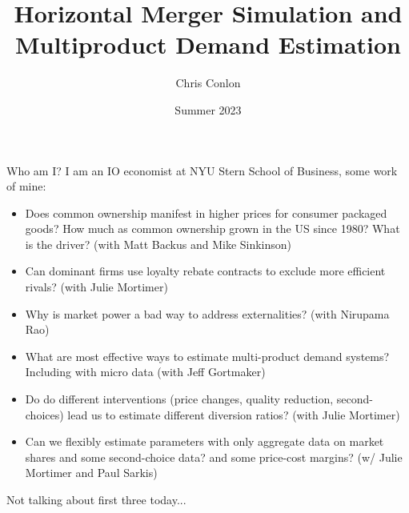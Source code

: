

\usepackage{lipsum}
\usepackage{amsmath} 
\usepackage{amsthm} 
\usepackage{amssymb} 
\usepackage{mathtools}
\usepackage{dutchcal}


\newcommand{\vect}[1]{\boldsymbol{\mathbf{#1}}}
\newcommand{\pd}[2]{\frac{\partial{#1}}{\partial{#2}}}
\newcommand{\expect}[2]{\mathbb{E}_{#1}\left[{#2}\right]}
\newcommand{\expectsmall}[2]{\mathbb{E}_{#1}{#2}}
\newcommand{\expectsuper}[3]{\mathbb{E}_{#1}^{#2}\left[{#3}\right]}
\newcommand{\ind}[1]{\mathbbm{1}\left\{{#1}\right\}}
\newcommand{\prob}[1]{\mathbb{P}\left\{{#1}\right\}}
\newcommand{\derivative}[2]{\frac{d{#2}}{d{#1}}}
\newcommand{\cat}[1]{\citeasnoun{#1}}


\newcommand*{\vertbar}{\rule[-1ex]{0.5pt}{2.5ex}}
\newcommand*{\horzbar}{\rule[.5ex]{2.5ex}{0.5pt}}


\title{Horizontal Merger Simulation and Multiproduct Demand Estimation}
\author{Chris Conlon}

\date{Summer 2023}








\begin{frame}[plain] %
\titlepage
\end{frame}


\begin{frame}{Who am I?}
I am an IO economist at NYU Stern School of Business, some work of mine:
\begin{itemize}
    \item Does \alert{common ownership} manifest in higher prices for consumer packaged goods? How much as common ownership grown in the US since 1980? What is the driver? (with Matt Backus and Mike Sinkinson)
    \item Can dominant firms use \alert{loyalty rebate contracts to exclude} more efficient rivals? (with Julie Mortimer)
    \item Why is market power a bad way to address \alert{externalities}? (with Nirupama Rao)
\item What are most effective ways to estimate multi-product demand systems? Including with micro data (with Jeff Gortmaker)
\item Do do \alert{different interventions} (price changes, quality reduction, second-choices) lead us to estimate different \alert{diversion ratios}? (with Julie Mortimer)
\item Can we flexibly estimate parameters with only aggregate data on market shares and some second-choice data? and some price-cost margins? (w/ Julie Mortimer and Paul Sarkis)
\end{itemize}
Not talking about first three today...
\end{frame}


